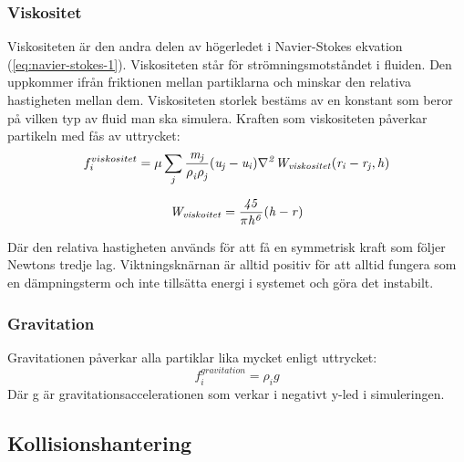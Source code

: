 \documentclass[a4paper,12pt,oneside,final]{extarticle}
\begin{document}
\subsubsection{Viskositet}
Viskositeten är den andra delen av högerledet i Navier-Stokes ekvation (\ref{eq:navier-stokes-1}).
Viskositeten står för strömningsmotståndet i fluiden.
Den uppkommer ifrån friktionen mellan partiklarna och minskar den relativa hastigheten mellan dem.
Viskositeten storlek bestäms av en konstant som beror på vilken typ av fluid man ska simulera.
Kraften som viskositeten påverkar partikeln med fås av uttrycket:
\begin{equation}
f^{viskositet}_i = \mu \sum_{j} {\it \frac{m_j}{\rho^{}_{i} \rho^{}_{j}} (u_j - u_i) \nabla^{2}_{} W_{viskositet} (r_i - r_j,h)}
\end{equation}

\begin{equation}
{\it W_{viskoitet} = \frac{45}{\pi h^6} {(h-r)}}
\end{equation}

Där den relativa hastigheten används för att få en symmetrisk kraft som följer Newtons tredje lag. Viktningsknärnan är alltid positiv för att alltid fungera som en dämpningsterm och inte tillsätta energi i systemet och göra det instabilt. 

\subsubsection{Gravitation}
Gravitationen påverkar alla partiklar lika mycket enligt uttrycket:
\begin{equation}
f^{gravitation}_{i} = \rho^{}_{i}g
\end{equation}
Där g är gravitationsaccelerationen som verkar i negativt y-led i simuleringen.

\subsection{Kollisionshantering}
\end{document}
